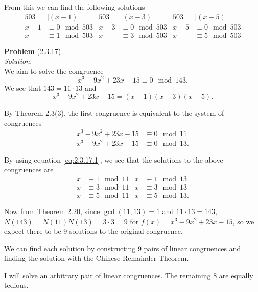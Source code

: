 \documentclass[12 pt]{amsart}
\begin{document}
  From this we can find the following solutions
  \begin{align*}
    503 &\mid (x-1) 
      & 503 &\mid (x-3) 
      & 503 &\mid (x-5)\\ 
    x -1 &\equiv 0 \mod 503 
      & x -3 &\equiv 0 \mod 503 
      & x -5 &\equiv 0 \mod 503 \\
    x &\equiv 1 \mod 503
      & x &\equiv 3 \mod 503 
      & x &\equiv 5 \mod 503 
  \end{align*}
\vfill
\newpage



\phantom{\quad} \vfill
\noindent
\textbf{Problem} (2.3.17) \\[4ex]
\emph{Solution.} \\[2ex]
  We aim to solve the congruence 
  \[
    x^3 - 9x^2 + 23x - 15 \equiv 0 \mod 143.
  \]
  We see that $143 = 11 \cdot 13$ and 
  \begin{equation}
    \label{eq:2.3.17.1}
    x^3 - 9x^2 + 23x - 15 = (x-1)(x-3)(x-5).
  \end{equation}

  By Theorem 2.3(3), the first congruence
  is equivalent to the system of congruences
  \begin{align*}
    x^3 - 9x^2 + 23x - 15 &\equiv 0 \mod 11 \\
    x^3 - 9x^2 + 23x - 15 &\equiv 0 \mod 13.
  \end{align*}

  By using equation \ref{eq:2.3.17.1}, we see
  that the solutions to the above congruences are
  \begin{align*}
    x &\equiv 1 \mod 11 & x &\equiv 1 \mod 13 \\
    x &\equiv 3 \mod 11 & x &\equiv 3 \mod 13 \\
    x &\equiv 5 \mod 11 & x &\equiv 5 \mod 13.
  \end{align*}
  
  Now from Theorem 2.20, since $\gcd(11,13) = 1$
  and $11 \cdot 13 = 143$, 
  $N(143) = N(11)N(13) = 3 \cdot 3 = 9$ for 
  $f(x) = x^3 - 9x^2 + 23x - 15$, so we expect
  there to be 9 solutions to the original congruence.

  We can find each solution by constructing 
  9 pairs of linear congruences and finding the
  solution with the Chinese Remainder Theorem.
  
  I will solve an arbitrary pair of linear congruences.
  The remaining 8 are equally tedious.
\end{document}
